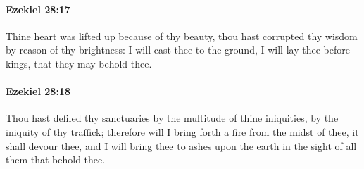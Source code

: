 		\paragraph{Ezekiel 28:17} %
			\label{EZEKIEL-28-17}

			Thine heart was lifted up because of thy beauty, thou hast corrupted thy wisdom by reason of thy brightness: I will cast thee to the ground, I will lay thee before kings, that they may behold thee.


		\paragraph{Ezekiel 28:18} %
			\label{EZEKIEL-28-18}

			Thou hast defiled thy sanctuaries by the multitude of thine iniquities, by the iniquity of thy traffick; therefore will I bring forth a fire from the midst of thee, it shall devour thee, and I will bring thee to ashes upon the earth in the sight of all them that behold thee.

